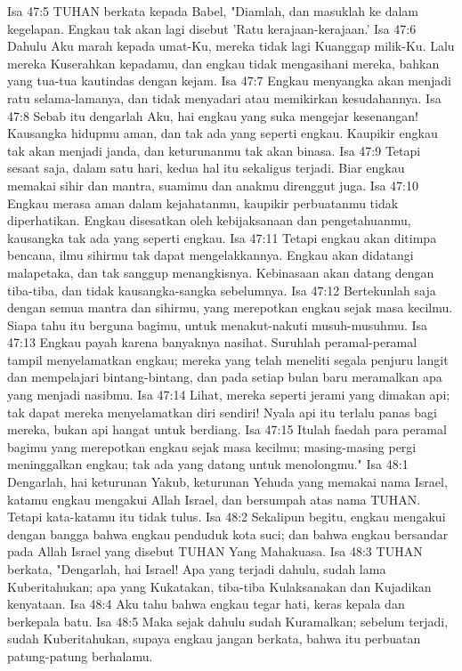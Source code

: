 Isa 47:5  TUHAN berkata kepada Babel, "Diamlah, dan masuklah ke dalam kegelapan. Engkau tak akan lagi disebut 'Ratu kerajaan-kerajaan.'
Isa 47:6  Dahulu Aku marah kepada umat-Ku, mereka tidak lagi Kuanggap milik-Ku. Lalu mereka Kuserahkan kepadamu, dan engkau tidak mengasihani mereka, bahkan yang tua-tua kautindas dengan kejam.
Isa 47:7  Engkau menyangka akan menjadi ratu selama-lamanya, dan tidak menyadari atau memikirkan kesudahannya.
Isa 47:8  Sebab itu dengarlah Aku, hai engkau yang suka mengejar kesenangan! Kausangka hidupmu aman, dan tak ada yang seperti engkau. Kaupikir engkau tak akan menjadi janda, dan keturunanmu tak akan binasa.
Isa 47:9  Tetapi sesaat saja, dalam satu hari, kedua hal itu sekaligus terjadi. Biar engkau memakai sihir dan mantra, suamimu dan anakmu direnggut juga.
Isa 47:10  Engkau merasa aman dalam kejahatanmu, kaupikir perbuatanmu tidak diperhatikan. Engkau disesatkan oleh kebijaksanaan dan pengetahuanmu, kausangka tak ada yang seperti engkau.
Isa 47:11  Tetapi engkau akan ditimpa bencana, ilmu sihirmu tak dapat mengelakkannya. Engkau akan didatangi malapetaka, dan tak sanggup menangkisnya. Kebinasaan akan datang dengan tiba-tiba, dan tidak kausangka-sangka sebelumnya.
Isa 47:12  Bertekunlah saja dengan semua mantra dan sihirmu, yang merepotkan engkau sejak masa kecilmu. Siapa tahu itu berguna bagimu, untuk menakut-nakuti musuh-musuhmu.
Isa 47:13  Engkau payah karena banyaknya nasihat. Suruhlah peramal-peramal tampil menyelamatkan engkau; mereka yang telah meneliti segala penjuru langit dan mempelajari bintang-bintang, dan pada setiap bulan baru meramalkan apa yang menjadi nasibmu.
Isa 47:14  Lihat, mereka seperti jerami yang dimakan api; tak dapat mereka menyelamatkan diri sendiri! Nyala api itu terlalu panas bagi mereka, bukan api hangat untuk berdiang.
Isa 47:15  Itulah faedah para peramal bagimu yang merepotkan engkau sejak masa kecilmu; masing-masing pergi meninggalkan engkau; tak ada yang datang untuk menolongmu."
Isa 48:1  Dengarlah, hai keturunan Yakub, keturunan Yehuda yang memakai nama Israel, katamu engkau mengakui Allah Israel, dan bersumpah atas nama TUHAN. Tetapi kata-katamu itu tidak tulus.
Isa 48:2  Sekalipun begitu, engkau mengakui dengan bangga bahwa engkau penduduk kota suci; dan bahwa engkau bersandar pada Allah Israel yang disebut TUHAN Yang Mahakuasa.
Isa 48:3  TUHAN berkata, "Dengarlah, hai Israel! Apa yang terjadi dahulu, sudah lama Kuberitahukan; apa yang Kukatakan, tiba-tiba Kulaksanakan dan Kujadikan kenyataan.
Isa 48:4  Aku tahu bahwa engkau tegar hati, keras kepala dan berkepala batu.
Isa 48:5  Maka sejak dahulu sudah Kuramalkan; sebelum terjadi, sudah Kuberitahukan, supaya engkau jangan berkata, bahwa itu perbuatan patung-patung berhalamu.
